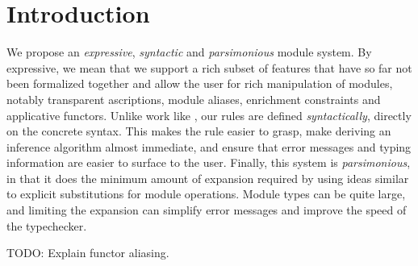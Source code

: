 \section{Introduction}

We propose an \emph{expressive}, \emph{syntactic} and \emph{parsimonious} module system.
By expressive, we mean that we support a rich subset of features that have so far
not been formalized together and allow the user for rich manipulation of modules, notably transparent ascriptions, module aliases, enrichment constraints and
applicative functors. Unlike work like \cite{fing}, our rules are
defined \emph{syntactically}, directly on the concrete syntax. This makes the rule easier to grasp, make deriving an inference algorithm almost immediate, and
ensure that error messages and typing information are easier to surface to the user.
Finally, this system is \emph{parsimonious}, in that it does the minimum amount of
expansion required by using ideas similar to explicit substitutions for
module operations. Module types can be quite large, and limiting the expansion
can simplify error messages and improve the speed of the typechecker.

TODO: Explain functor aliasing.

